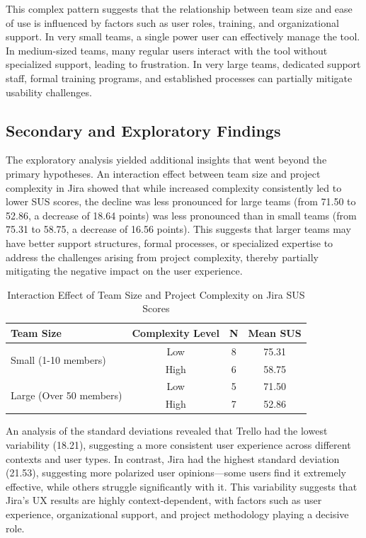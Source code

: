 \documentclass[runningheads]{llncs}
\begin{document}
This complex pattern suggests that the relationship between team size and ease of use is influenced by factors such as user roles, training, and organizational support. In very small teams, a single power user can effectively manage the tool. In medium-sized teams, many regular users interact with the tool without specialized support, leading to frustration. In very large teams, dedicated support staff, formal training programs, and established processes can partially mitigate usability challenges.



\subsection{Secondary and Exploratory Findings}
The exploratory analysis yielded additional insights that went beyond the primary hypotheses. An interaction effect between team size and project complexity in Jira showed that while increased complexity consistently led to lower SUS scores, the decline was less pronounced for large teams (from 71.50 to 52.86, a decrease of 18.64 points) was less pronounced than in small teams (from 75.31 to 58.75, a decrease of 16.56 points). This suggests that larger teams may have better support structures, formal processes, or specialized expertise to address the challenges arising from project complexity, thereby partially mitigating the negative impact on the user experience.

\begin{table}[h]
\caption{Interaction Effect of Team Size and Project Complexity on Jira SUS Scores}
\centering
\begin{tabular}{l c c c}
\toprule
\textbf{Team Size} & \textbf{Complexity Level} & \textbf{N} & \textbf{Mean SUS} \\
\midrule
\multirow{2}{*}{Small (1-10 members)} & Low & 8 & 75.31 \\
& High & 6 & 58.75 \\
\midrule
\multirow{2}{*}{Large (Over 50 members)} & Low & 5 & 71.50 \\
& High & 7 & 52.86 \\
\bottomrule
\end{tabular}
\end{table}


An analysis of the standard deviations revealed that Trello had the lowest variability (18.21), suggesting a more consistent user experience across different contexts and user types. In contrast, Jira had the highest standard deviation (21.53), suggesting more polarized user opinions—some users find it extremely effective, while others struggle significantly with it. This variability suggests that Jira’s UX results are highly context-dependent, with factors such as user experience, organizational support, and project methodology playing a decisive role.
\end{document}
